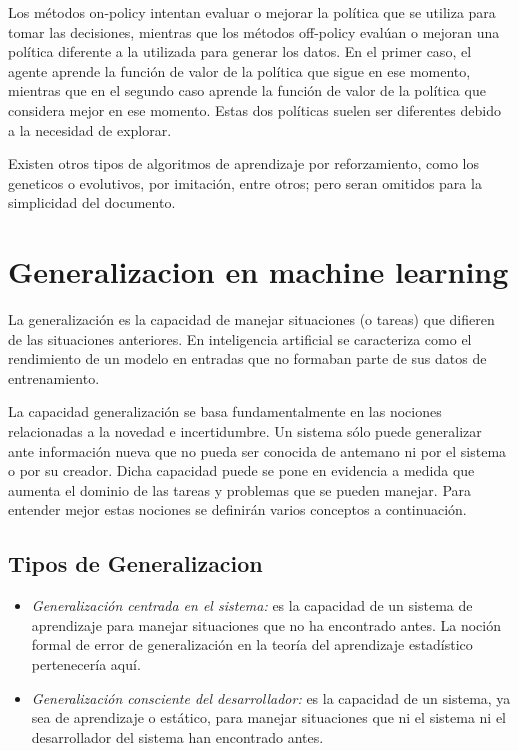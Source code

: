 Los métodos on-policy intentan evaluar o mejorar la política que se utiliza para tomar las decisiones, mientras que los métodos off-policy evalúan o mejoran una política diferente a la utilizada para generar los datos. En el primer caso, el agente aprende la función de valor de la política que sigue en ese momento, mientras que en el segundo caso aprende la función de valor de la política que considera mejor en ese momento. Estas dos políticas suelen ser diferentes debido a la necesidad de explorar.

Existen otros tipos de algoritmos de aprendizaje por reforzamiento, como los geneticos o evolutivos, por imitación, entre otros; pero seran omitidos para la simplicidad del documento.

\section{Generalizacion en machine learning}\label{section:state-of-the-art:generalization-on-machine-learning}

La generalización es la capacidad de manejar situaciones (o tareas) que difieren de las situaciones anteriores. En inteligencia artificial se caracteriza como el rendimiento de un modelo en entradas que no formaban parte de sus datos de entrenamiento.

La capacidad generalización se basa fundamentalmente en las nociones relacionadas a la novedad e incertidumbre. Un sistema sólo puede generalizar ante información nueva que no pueda ser conocida de antemano ni por el sistema o por su creador. Dicha capacidad puede se pone en evidencia a medida que aumenta el dominio de las tareas y problemas que se pueden manejar. Para entender mejor estas nociones se definirán varios conceptos a continuación.

\subsection{Tipos de Generalizacion}

\begin{itemize}
\item \textit{Generalización centrada en el sistema:} es la capacidad de un sistema de aprendizaje para manejar situaciones que no ha encontrado antes. La noción formal de error de generalización en la teoría del aprendizaje estadístico pertenecería aquí.

\item \textit{Generalización consciente del desarrollador:} es la capacidad de un sistema, ya sea de aprendizaje o estático, para manejar situaciones que ni el sistema ni el desarrollador del sistema han encontrado antes.
\end{itemize}


